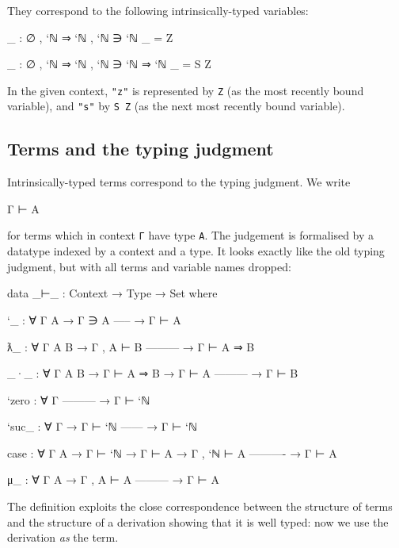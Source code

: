 They correspond to the following intrinsically-typed variables:

\begin{fence}
\begin{code}
_ : ∅ , `ℕ ⇒ `ℕ , `ℕ ∋ `ℕ
_ = Z

_ : ∅ , `ℕ ⇒ `ℕ , `ℕ ∋ `ℕ ⇒ `ℕ
_ = S Z
\end{code}
\end{fence}

In the given context, \texttt{"z"} is represented by \texttt{Z} (as the
most recently bound variable), and \texttt{"s"} by \texttt{S\ Z} (as the
next most recently bound variable).

\hypertarget{terms-and-the-typing-judgment}{%
\subsection{Terms and the typing
judgment}\label{terms-and-the-typing-judgment}}

Intrinsically-typed terms correspond to the typing judgment. We write

\begin{myDisplay}
Γ ⊢ A
\end{myDisplay}

for terms which in context \texttt{Γ} have type \texttt{A}. The
judgement is formalised by a datatype indexed by a context and a type.
It looks exactly like the old typing judgment, but with all terms and
variable names dropped:

\begin{fence}
\begin{code}
data _⊢_ : Context → Type → Set where

  `_ : ∀ {Γ A}
    → Γ ∋ A
      -----
    → Γ ⊢ A

  ƛ_  : ∀ {Γ A B}
    → Γ , A ⊢ B
      ---------
    → Γ ⊢ A ⇒ B

  _·_ : ∀ {Γ A B}
    → Γ ⊢ A ⇒ B
    → Γ ⊢ A
      ---------
    → Γ ⊢ B

  `zero : ∀ {Γ}
      ---------
    → Γ ⊢ `ℕ

  `suc_ : ∀ {Γ}
    → Γ ⊢ `ℕ
      ------
    → Γ ⊢ `ℕ

  case : ∀ {Γ A}
    → Γ ⊢ `ℕ
    → Γ ⊢ A
    → Γ , `ℕ ⊢ A
      ----------
    → Γ ⊢ A

  μ_ : ∀ {Γ A}
    → Γ , A ⊢ A
      ---------
    → Γ ⊢ A
\end{code}
\end{fence}

The definition exploits the close correspondence between the structure
of terms and the structure of a derivation showing that it is well
typed: now we use the derivation \emph{as} the term.

